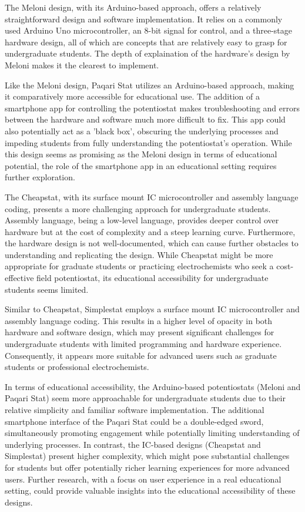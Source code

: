 \documentclass{article}
\begin{document}
The Meloni design, with its Arduino-based approach, offers a relatively straightforward design and software implementation. It relies on a commonly used Arduino Uno microcontroller, an 8-bit signal for control, and a three-stage hardware design, all of which are concepts that are relatively easy to grasp for undergraduate students. The depth of explaination of the hardware's design by Meloni makes it the clearest to implement.

Like the Meloni design, Paqari Stat utilizes an Arduino-based approach, making it comparatively more accessible for educational use. The addition of a smartphone app for controlling the potentiostat makes troubleshooting and errors between the hardware and software much more difficult to fix. This app could also potentially act as a 'black box', obscuring the underlying processes and impeding students from fully understanding the potentiostat's operation. While this design seems as promising as the Meloni design in terms of educational potential, the role of the smartphone app in an educational setting requires further exploration.

The Cheapstat, with its surface mount IC microcontroller and assembly language coding, presents a more challenging approach for undergraduate students. Assembly language, being a low-level language, provides deeper control over hardware but at the cost of complexity and a steep learning curve. Furthermore, the hardware design is not well-documented, which can cause further obstacles to understanding and replicating the design. While Cheapstat might be more appropriate for graduate students or practicing electrochemists who seek a cost-effective field potentiostat, its educational accessibility for undergraduate students seems limited.

Similar to Cheapstat, Simplestat employs a surface mount IC microcontroller and assembly language coding. This results in a higher level of opacity in both hardware and software design, which may present significant challenges for undergraduate students with limited programming and hardware experience. Consequently, it appears more suitable for advanced users such as graduate students or professional electrochemists.

In terms of educational accessibility, the Arduino-based potentiostats (Meloni and Paqari Stat) seem more approachable for undergraduate students due to their relative simplicity and familiar software implementation. The additional smartphone interface of the Paqari Stat could be a double-edged sword, simultaneously promoting engagement while potentially limiting understanding of underlying processes. In contrast, the IC-based designs (Cheapstat and Simplestat) present higher complexity, which might pose substantial challenges for students but offer potentially richer learning experiences for more advanced users. Further research, with a focus on user experience in a real educational setting, could provide valuable insights into the educational accessibility of these designs.
\end{document}
